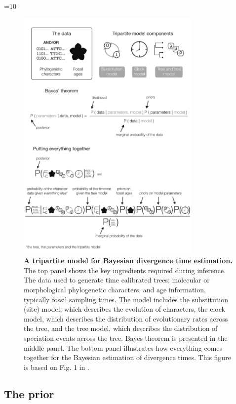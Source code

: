 \ifnum\value{num}=10{
\begin{figure}
\centering
\includegraphics[width=0.8\textwidth]{Cambridge-Elements/manuscript.R2/submitted_figs//figure2}
\caption{\footnotesize\textbf{A tripartite model for Bayesian divergence time estimation.}
The top panel shows the key ingredients required during inference.
The data used to generate time calibrated trees: molecular or morphological phylogenetic characters, and age information, typically fossil sampling times.
The model includes the substitution (site) model, which describes the evolution of characters, the clock model, which describes the distribution of evolutionary rates across the tree, and the tree model, which describes the distribution of speciation events across the tree.
Bayes theorem is presented in the middle panel. 
The bottom panel illustrates how everything comes together for the Bayesian estimation of divergence times.
This figure is based on Fig. 1 in \citep{duPlessis2015}.
}
\label{fig:bayes}
\end{figure} }\else{}\fi

\subsection{The prior}

